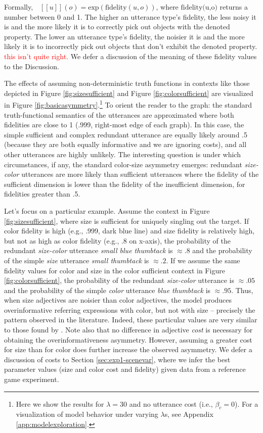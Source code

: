 \documentclass[11pt]{article}
\newcommand{\red}[1]{\textcolor{Red}{#1}}
\newcommand{\denote}[1]{\mbox{ $[\![ #1 ]\!]$}}
\newcommand{\figref}[1]{Figure \ref{#1}}
\newcommand{\appref}[1]{Appendix \ref{#1}}
\newcommand{\sectionref}[1]{Section \ref{#1}}
\begin{document}
Formally, $\denote{u}(o) = \textrm{exp}(\textrm{fidelity}(u,o))$, where $\textrm{fidelity(u,o)}$ returns a number between 0 and 1. The higher an utterance type's fidelity, the less noisy it is and the more likely it is to correctly pick out objects with the denoted property. The lower an utterance type's fidelity, the noisier it is and the more likely it is to incorrectly pick out objects that don't exhibit the denoted property. \red{this isn't quite right. } We defer a discussion of the meaning of these fidelity values to the Discussion.

The effects of assuming non-deterministic truth functions in contexts like those depicted in \figref{fig:sizesufficient} and \figref{fig:colorsufficient} are visualized in \figref{fig:basicasymmetry}.\footnote{Here we show the results for $\lambda = 30$  and no utterance cost (i.e., $\beta_c = 0$). For a visualization of model behavior under varying $\lambda$s, see \appref{app:modelexploration}.} To orient the reader to the graph: the standard truth-functional semantics of the utterances are approximated where both fidelities are close to 1 (.999, right-most edge of each graph). In this case, the simple sufficient and complex redundant utterance are equally likely around .5 (because they are both equally informative and we are ignoring costs), and all other utterances are highly unlikely. The interesting question is under which circumstances, if any,  the standard color-size asymmetry emerges: redundant \emph{size-color} utterances are more likely than sufficient utterances where the fidelity of the sufficient dimension is lower than the fidelity of the insufficient dimension, for fidelities greater than .5. 

Let's focus on a particular example. Assume the context in \figref{fig:sizesufficient}, where size is sufficient for uniquely singling out the target. If color fidelity is high (e.g., .999, dark blue line) and size fidelity is relatively high, but not as high as color fidelity (e.g., .8 on x-axis), the probability of the redundant \emph{size-color} utterance \emph{small blue thumbtack} is $\approx .8$ and the probability of the simple \emph{size} utterance \emph{small thumbtack} is $\approx .2$. If we assume the same fidelity values for color and size in the color sufficient context in \figref{fig:colorsufficient}, the probability of the redundant \emph{size-color} utterance is $\approx .05$ and the probability of the simple \emph{color} utterance \emph{blue thumbtack} is $\approx .95$. Thus, when size adjectives are noisier than color adjectives, the model produces overinformative referring expressions with color, but not with size -- precisely the pattern observed in the literature. Indeed, these particular values are very similar to those found by . Note also that no difference in adjective \emph{cost} is necessary for obtaining the overinformativeness asymmetry. However, assuming a greater cost for size than for color does further increase the observed asymmetry. We defer a discussion of costs to \sectionref{sec:exp1-scenevar}, where we infer the best parameter values (size and color cost and fidelity) given data from a reference game experiment.
\end{document}
